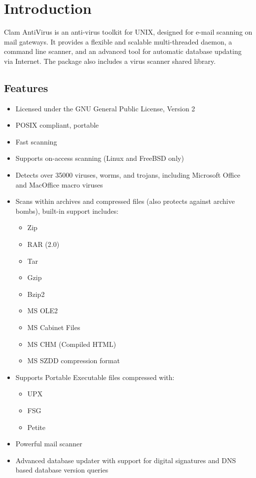 \documentclass[a4paper,titlepage,12pt]{article}
\begin{document}
    \newpage

    \section{Introduction}

    Clam AntiVirus is an anti-virus toolkit for UNIX, designed for e-mail
    scanning on mail gateways. It provides a flexible and scalable
    multi-threaded daemon, a command line scanner, and an advanced tool for
    automatic database updating via Internet. The package also includes
    a virus scanner shared library.

    \subsection{Features}

    \begin{itemize}
	\item{Licensed under the GNU General Public License, Version 2}
	\item{POSIX compliant, portable}
	\item{Fast scanning}
	\item{Supports on-access scanning (Linux and FreeBSD only)}
	\item{Detects over 35000 viruses, worms, and trojans, including
	      Microsoft Office and MacOffice macro viruses}
	\item{Scans within archives and compressed files (also protects
	      against archive bombs), built-in support includes:
	      \begin{itemize}
		\item Zip
		\item RAR (2.0)
		\item Tar
		\item Gzip
		\item Bzip2
		\item MS OLE2
		\item MS Cabinet Files
		\item MS CHM (Compiled HTML)
		\item MS SZDD compression format
	      \end{itemize}}
	\item{Supports Portable Executable files compressed with:}
	      \begin{itemize}
		\item UPX
		\item FSG
		\item Petite
	      \end{itemize}
	\item{Powerful mail scanner}
	\item{Advanced database updater with support for digital signatures
	      and DNS based database version queries}
    \end{itemize}
\end{document}
